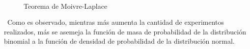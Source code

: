 \documentclass[8pt]{article}
\begin{document}
\begin{figure}
        \\
        \caption{Teorema de Moivre-Laplace}
        \label{f:animales}

\end{figure}

\
Como es observado, mientras más aumenta la cantidad de experimentos realizados, más se asemeja la función de masa de probabilidad de la distribución binomial a la función de densidad de probabilidad de la distribución normal.
\end{document}
